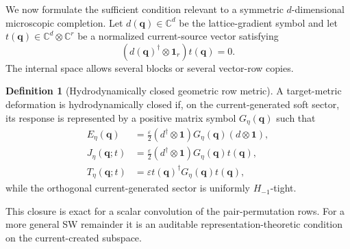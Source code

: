 \documentclass[11pt]{article}
\theoremstyle{definition}
\newtheorem{definition}[theorem]{Definition}
\theoremstyle{remark}
\newcommand{\Id}{\mathbf 1}
\newcommand{\eps}{\varepsilon}
\newcommand{\bq}{\bm q}
\begin{document}
We now formulate the sufficient condition relevant to a symmetric
$d$-dimensional microscopic completion.  Let $d(\bq)\in\mathbb C^d$ be the
lattice-gradient symbol and let $t(\bq)\in\mathbb C^d\otimes\mathbb C^r$ be a
normalized current-source vector satisfying
\begin{equation}
 (d(\bq)^\dagger\otimes\Id_r)t(\bq)=0.
 \label{eq:transverse-symbol}
\end{equation}
The internal space allows several blocks or several vector-row copies.

\begin{definition}[Hydrodynamically closed geometric row metric]
\label{def:hydro-closed}
A target-metric deformation is hydrodynamically closed if, on the
current-generated soft sector, its response is represented by a positive
matrix symbol $G_\eta(\bq)$ such that
\begin{align}
 E_\eta(\bq)&=\frac{\eps}{2}
 (d^\dagger\otimes\Id)G_\eta(\bq)(d\otimes\Id),
 \label{eq:hydro-energy}\\
 J_\eta(\bq;t)&=\frac{\eps}{2}
 (d^\dagger\otimes\Id)G_\eta(\bq)t(\bq),
 \label{eq:hydro-current}\\
 T_\eta(\bq;t)&=\eps t(\bq)^\dagger G_\eta(\bq)t(\bq),
 \label{eq:hydro-stress}
\end{align}
while the orthogonal current-generated sector is uniformly $H_{-1}$-tight.
\end{definition}

This closure is exact for a scalar convolution of the pair-permutation rows.
For a more general SW remainder it is an auditable representation-theoretic
condition on the current-created subspace.
\end{document}
